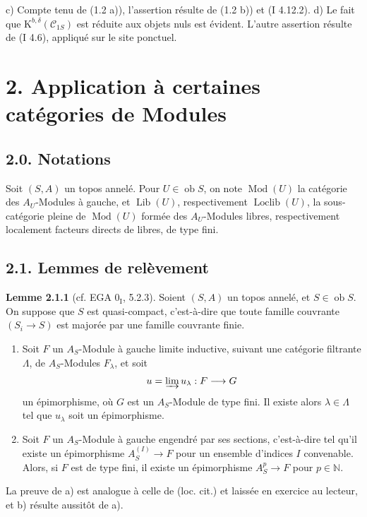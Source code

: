 \documentclass[11pt]{article}
\providecommand{\Mod}{\operatorname{Mod}}
\providecommand{\Lib}{\operatorname{Lib}}
\providecommand{\Loclib}{\operatorname{Loclib}}
\providecommand{\Ob}{\operatorname{ob}}
\begin{document}
c) Compte tenu de (1.2 a)), l'assertion résulte de (1.2 b)) et (I 4.12.2). d) Le fait que $\mathrm K^{b,\delta}(\mathcal C_{1S})$ est réduite aux objets nuls est évident. L'autre assertion résulte de (I 4.6), appliqué sur le site ponctuel.

\section*{2. Application à certaines catégories de Modules}
\subsection*{2.0. Notations}
Soit $(S,A)$ un topos annelé. Pour $U\in\Ob S$, on note $\Mod(U)$ la catégorie des $A_U$-Modules à gauche, et $\Lib(U)$, respectivement $\Loclib(U)$, la sous-catégorie pleine de $\Mod(U)$ formée des $A_U$-Modules libres, respectivement localement facteurs directs de libres, de type fini.

\subsection*{2.1. Lemmes de relèvement}

\textbf{Lemme 2.1.1} (cf. EGA $0_{\mathrm I}$, 5.2.3). Soient $(S,A)$ un topos annelé, et $S\in\Ob S$. On suppose que $S$ est quasi-compact, c'est-à-dire que toute famille couvrante $(S_i\to S)$ est majorée par une famille couvrante finie.
\begin{enumerate}[label=\alph*)]
\item Soit $F$ un $A_S$-Module à gauche limite inductive, suivant une catégorie filtrante $\Lambda$, de $A_S$-Modules $F_\lambda$, et soit
\[
u=\varinjlim u_\lambda:F\longrightarrow G
\]
un épimorphisme, où $G$ est un $A_S$-Module de type fini. Il existe alors $\lambda\in\Lambda$ tel que $u_\lambda$ soit un épimorphisme.
\item Soit $F$ un $A_S$-Module à gauche engendré par ses sections, c'est-à-dire tel qu'il existe un épimorphisme $A_S^{(I)}\to F$ pour un ensemble d'indices $I$ convenable. Alors, si $F$ est de type fini, il existe un épimorphisme $A_S^p\to F$ pour $p\in\mathbb N$.
\end{enumerate}
La preuve de a) est analogue à celle de (loc. cit.) et laissée en exercice au lecteur, et b) résulte aussitôt de a).
\end{document}
